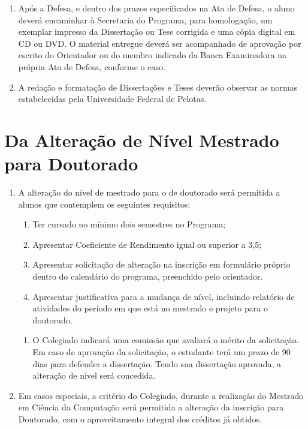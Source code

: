 \documentclass{article}
\newcommand{\singleitem}{\item[Parágrafo Único.]}
\newcommand{\grupoMenor}{Colegiado\xspace}
\begin{document}
\begin{enumerate}
	\item Após a Defesa, e dentro dos prazos especificados na Ata de Defesa, o aluno deverá encaminhar à Secretaria do Programa, para homologação, um exemplar impresso da Dissertação ou Tese corrigida e uma cópia digital em CD ou DVD. O material entregue deverá ser acompanhado de aprovação por escrito do Orientador ou do membro indicado da Banca Examinadora na própria Ata de Defesa, conforme o caso.

	\item A redação e formatação de Dissertações e Teses deverão observar as normas estabelecidas pela Universidade Federal de Pelotas.

\end{enumerate}



\section{Da Alteração de Nível Mestrado para Doutorado}
\begin{enumerate}
	\item  A alteração do nível de mestrado para o de doutorado será permitida a alunos que contemplem os seguintes requisitos:
	\begin{enumerate}[label=\Roman*]
		\item Ter cursado no mínimo dois semestres no Programa;

		\item Apresentar Coeficiente de Rendimento igual ou superior a 3,5;

		\item Apresentar solicitação de alteração na inscrição em formulário próprio dentro do calendário do programa, preenchido pelo orientador.

		\item Apresentar justificativa para a mudança de nível, incluindo relatório de atividades do período em que está no mestrado e projeto para o doutorado.
	\end{enumerate}

	\begin{enumerate}
		\singleitem O \grupoMenor indicará uma comissão que avaliará o mérito da solicitação. Em caso de aprovação da solicitação, o estudante terá um prazo de 90 dias para defender a dissertação. Tendo sua dissertação aprovada, a alteração de nível será concedida.
	\end{enumerate}

	\item Em casos especiais, a critério do \grupoMenor, durante a realização do Mestrado em Ciência da Computação será permitida a alteração da inscrição para Doutorado, com o aproveitamento integral dos créditos já obtidos.	

\end{enumerate}
\end{document}
